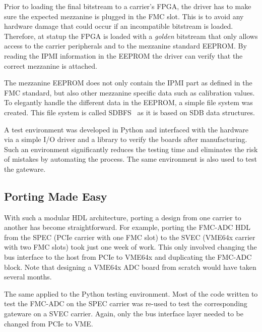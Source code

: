 \documentclass{JAC2003}
\begin{document}
Prior to loading the final bitstream to a carrier's FPGA, the driver has to make sure the expected mezzanine is plugged in the FMC slot.
This is to avoid any hardware damage that could occur if an incompatible bitstream is loaded.
Therefore, at statup the FPGA is loaded with a \textit{golden} bitstream that only allows access to the carrier peripherals and to the mezzanine standard EEPROM.
By reading the IPMI information in the EEPROM the driver can verify that the correct mezzanine is attached.

The mezzanine EEPROM does not only contain the IPMI part as defined in the FMC standard, but also other mezzanine specific data such as calibration values.
To elegantly handle the different data in the EEPROM, a simple file system was created.
This file system is called SDBFS~\cite{sdbfs} as it is based on SDB data structures.

A test environment was developed in Python and interfaced with the hardware via a simple I/O driver and a library to verify the boards after manufacturing.
Such an environment significantly reduces the testing time and eliminates the risk of mistakes by automating the process.
The same environment is also used to test the gateware.

\subsection{Porting Made Easy}
With such a modular HDL architecture, porting a design from one carrier to another has become straightforward.
For example, porting the FMC-ADC HDL from the SPEC (PCIe carrier with one FMC slot) to the SVEC (VME64x carrier with two FMC slots) took just one week of work.
This only involved changing the bus interface to the host from PCIe to VME64x and duplicating the FMC-ADC block.
Note that designing a VME64x ADC board from scratch would have taken several months.

The same applied to the Python testing environment.
Most of the code written to test the FMC-ADC on the SPEC carrier was re-used to test the corresponding gateware on a SVEC carrier.
Again, only the bus interface layer needed to be changed from PCIe to VME.

\begin{comment}
\subsection{Release Concept}
Usually, a single product involves several different OHWR projects.
By product, we mean a functional set of carrier and mezzanine boards along with gateware and software (e.g FMC-ADC + SPEC).
For a user to be able to use a product, at least three projects are needed; the carrier project for the golden bitstream, the mezzanine project for the application bitstream and the mezzanine software support project for the Linux device driver and test program.
To have better traceability, a release procedure was put in place.
For each component (gateware or software), the development is frozen into a \textit{release}.
In addition, compatible releases of the gateware and software are bundled together in an archive.
\end{comment}
\end{document}

